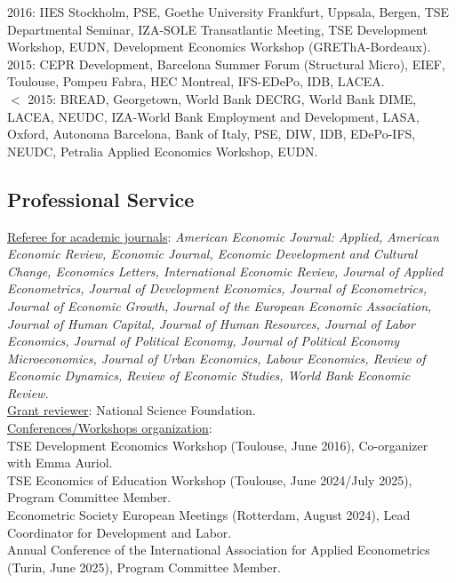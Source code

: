 \documentclass[12pt,english]{article}
\begin{document}
2016: IIES Stockholm, PSE, Goethe University Frankfurt, Uppsala, Bergen, TSE Departmental Seminar, IZA-SOLE Transatlantic Meeting, TSE Development Workshop, EUDN,  Development Economics Workshop (GREThA-Bordeaux).\vspace{0.2cm} \\
2015:  CEPR Development, Barcelona Summer Forum (Structural Micro), EIEF, Toulouse, Pompeu Fabra, HEC Montreal, IFS-EDePo, IDB, LACEA.  \vspace{0.2cm} \\
$<$ 2015: BREAD, Georgetown, World Bank DECRG, World Bank DIME, LACEA, NEUDC, IZA-World Bank Employment and Development, LASA, Oxford, Autonoma Barcelona, Bank of Italy, PSE, DIW, IDB, EDePo-IFS, NEUDC, Petralia Applied Economics Workshop, EUDN.  


\subsection*{Professional Service}

\noindent \underline{Referee for academic journals}: \textit{American Economic Journal: Applied, American Economic Review, Economic Journal, Economic Development and Cultural Change, Economics Letters, International Economic Review, Journal of Applied Econometrics, Journal of Development Economics, Journal of Econometrics, Journal of Economic Growth, Journal of the European Economic Association, Journal of Human Capital, Journal of Human Resources, Journal of Labor Economics, Journal of Political Economy,  Journal of Political Economy Microeconomics, Journal of Urban Economics, Labour Economics, Review of Economic Dynamics, Review of Economic Studies, World Bank Economic Review.} \\

\noindent \underline{Grant reviewer}: National Science Foundation. \\

\noindent \underline{Conferences/Workshops organization}:\\
TSE Development Economics Workshop (Toulouse, June 2016), Co-organizer with Emma Auriol.\vspace{0.2cm} \\
TSE Economics of Education Workshop (Toulouse, June 2024/July 2025), Program Committee Member. \vspace{0.2cm} \\
Econometric Society European Meetings (Rotterdam, August 2024), Lead Coordinator for Development and Labor.\vspace{0.2cm}\\
Annual Conference of the International Association for Applied Econometrics (Turin, June 2025), Program Committee Member.\\
\end{document}
